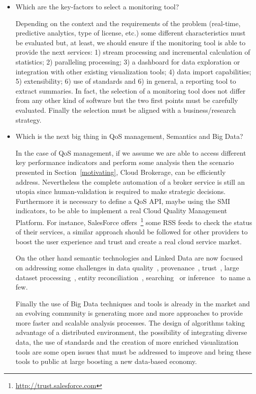 \begin{itemize}
\item Which are the key-factors to select a monitoring tool?


Depending on the context and the requirements of the problem (real-time, predictive analytics, type of license, etc.) 
some different characteristics must be evaluated but, at least, we should ensure if the monitoring tool 
is able to provide the next services: 1) stream processing and incremental calculation of statistics; 
2) paralleling processing; 3) a dashboard for data exploration or integration with other 
existing visualization tools; 4) data import capabilities; 5) extensibility; 6) use of standards and 6) in general, 
a reporting tool to extract summaries. In fact, the selection of a monitoring tool does not differ from 
any other kind of software but the two first points must be carefully evaluated. Finally the selection 
must be aligned with a business/research strategy.


\item Which is the next big thing in QoS management, Semantics and Big Data?

In the case of QoS management, if we assume we are able to access different key performance indicators and perform 
some analysis then the scenario presented in Section~\ref{motivating}, Cloud Brokerage, can 
be efficiently address. Nevertheless the complete automation of a broker service is still 
an utopia since human-validation is required to make strategic decisions. Furthermore it is necessary 
to define a QoS API, maybe using the SMI indicators, to be able to implement a real Cloud Quality Management 
Platform. For instance, SalesForce offers~\footnote{\url{http://trust.salesforce.com}} 
some RSS feeds to check the status of their services, a similar approach should be followed for other providers to boost 
the user experience and trust and create a real cloud service market.

On the other hand semantic technologies and Linked Data are now focused on addressing some challenges in
data quality~\cite{bizer2007,Bizer2009QA,lodq,link-qa}, provenance~\cite{DBLP:conf/ipaw/HartigZ10}, trust~\cite{Carroll05namedgraphs}, 
large dataset processing~\cite{DBLP:conf/closer/HausenblasGHC12}, entity reconciliation~\cite{Maali_Cyganiak_2011}, 
searching~\cite{hoga-etal-2011-swse-JWS} or inference~\cite{DBLP:journals/ws/BonattiHPS11} to name a few.

Finally the use of Big Data techniques and tools is already in the market and an evolving community is generating 
more and more approaches to provide more faster and scalable analysis processes. The design of algorithms taking 
advantage of a distributed environment, the possibility of integrating diverse data, the use of standards and the creation 
of more enriched visualization tools are some open issues that must be addressed to improve and bring these tools 
to public at large boosting a new data-based economy.

\end{itemize}







